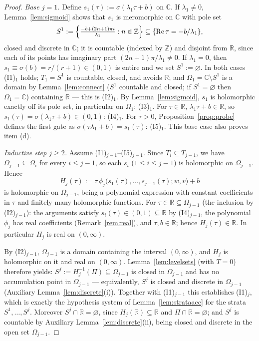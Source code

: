 \documentclass[11pt]{article}
\theoremstyle{definition}
\theoremstyle{remark}
\theoremstyle{plain}
\newcommand{\R}{\mathbb{R}}
\newcommand{\C}{\mathbb{C}}
\newcommand{\Z}{\mathbb{Z}}
\newcommand{\sig}{\sigma}
\begin{document}
\begin{proof}
\emph{Base $j=1$.}  Define $s_1(\tau):=\sig(\lambda_1\tau+b)$ on $\C$.  If
$\lambda_1\neq0$, Lemma~\ref{lem:sigmoid} shows that $s_1$ is meromorphic on $\C$ with
pole set
\[
S^1:=\Bigl\{\tfrac{-b+(2n+1)\pi i}{\lambda_1}:n\in\Z\Bigr\}
\subseteq\{\operatorname{Re}\tau=-b/\lambda_1\},
\]
closed and discrete in $\C$; it is countable (indexed by $\Z$) and disjoint from $\R$,
since each of its points has imaginary part $(2n+1)\pi/\lambda_1\neq0$.  If
$\lambda_1=0$, then $s_1\equiv\sig(b)=r/(r+1)\in(0,1)$ is entire and we set
$S^1:=\varnothing$.  In both cases (I1)$_1$ holds; $T_1=S^1$ is countable, closed, and
avoids $\R$; and $\Omega_1=\C\setminus S^1$ is a domain by Lemma~\ref{lem:connect}
($S^1$ countable and closed; if $S^1=\varnothing$ then $\Omega_1=\C$) containing $\R$ ---
this is (I2)$_1$.  By Lemma~\ref{lem:sigmoid}, $s_1$ is holomorphic exactly off its pole
set, in particular on $\Omega_1$: (I3)$_1$.  For $\tau\in\R$, $\lambda_1\tau+b\in\R$, so
$s_1(\tau)=\sig(\lambda_1\tau+b)\in(0,1)$: (I4)$_1$.  For $\tau>0$,
Proposition~\ref{prop:probe} defines the first gate as
$\sig(\tau\lambda_1+b)=s_1(\tau)$: (I5)$_1$.  This base case also proves item (d).

\emph{Inductive step $j\ge2$.}  Assume (I1)$_{j-1}$--(I5)$_{j-1}$.  Since
$T_i\subseteq T_{j-1}$, we have $\Omega_{j-1}\subseteq\Omega_i$ for every $i\le j-1$, so
each $s_i$ ($1\le i\le j-1$) is holomorphic on $\Omega_{j-1}$.  Hence
\[
H_j(\tau):=\tau\,\phi_j\bigl(s_1(\tau),\dots,s_{j-1}(\tau);w,v\bigr)+b
\]
is holomorphic on $\Omega_{j-1}$, being a polynomial expression with constant
coefficients in $\tau$ and finitely many holomorphic functions.  For
$\tau\in\R\subseteq\Omega_{j-1}$ (the inclusion by (I2)$_{j-1}$): the arguments satisfy
$s_i(\tau)\in(0,1)\subseteq\R$ by (I4)$_{j-1}$, the polynomial $\phi_j$ has real
coefficients (Remark~\ref{rem:real}), and $\tau,b\in\R$; hence $H_j(\tau)\in\R$.  In
particular $H_j$ is real on $(0,\infty)$.

By (I2)$_{j-1}$, $\Omega_{j-1}$ is a domain containing the interval $(0,\infty)$, and
$H_j$ is holomorphic on it and real on $(0,\infty)$.  Lemma~\ref{lem:levelsets} (with
$T=0$) therefore yields: $S^j:=H_j^{-1}(\Pi)\subseteq\Omega_{j-1}$ is closed in
$\Omega_{j-1}$ and has no accumulation point in $\Omega_{j-1}$ --- equivalently, $S^j$ is
closed and discrete in $\Omega_{j-1}$ (Auxiliary Lemma~\ref{lem:discrete}(i)).  Together
with (I1)$_{j-1}$ this establishes (I1)$_j$, which is exactly the hypothesis system of
Lemma~\ref{lem:strataacc} for the strata $S^1,\dots,S^j$.  Moreover
$S^j\cap\R=\varnothing$, since $H_j(\R)\subseteq\R$ and $\Pi\cap\R=\varnothing$; and
$S^j$ is countable by Auxiliary Lemma~\ref{lem:discrete}(ii), being closed and discrete
in the open set $\Omega_{j-1}$.


\end{proof}
\end{document}
